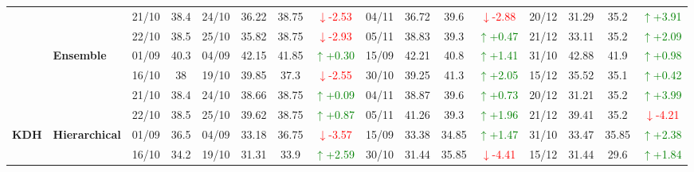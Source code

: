{\begin{longtable}{llcc|cccc|cccc|cccc}
& 
& 21/10 & 38.4 & 24/10 & 36.22 & 38.75 & \textcolor{red}{\(\downarrow\)-2.53} & 04/11 & 36.72 & 39.6 & \textcolor{red}{\(\downarrow\)-2.88} & 20/12 & 31.29 & 35.2 & \textcolor{green}{\(\uparrow\)+3.91} \\

&
& 22/10 & 38.5 & 25/10 & 35.82 & 38.75 & \textcolor{red}{\(\downarrow\)-2.93} & 05/11 & 38.83 & 39.3 & \textcolor{green}{\(\uparrow\)+0.47} & 21/12 & 33.11 & 35.2 & \textcolor{green}{\(\uparrow\)+2.09} \\
\cmidrule(lr){2-16}


& \textbf{Ensemble}
& 01/09 & 40.3 & 04/09 & 42.15 & 41.85 & \textcolor{green}{\(\uparrow\)+0.30} & 15/09 & 42.21 & 40.8 & \textcolor{green}{\(\uparrow\)+1.41} & 31/10 & 42.88 & 41.9 & \textcolor{green}{\(\uparrow\)+0.98} \\

& 
& 16/10 & 38 & 19/10 & 39.85 & 37.3 & \textcolor{red}{\(\downarrow\)-2.55} & 30/10 & 39.25 & 41.3 & \textcolor{green}{\(\uparrow\)+2.05} & 15/12 & 35.52 & 35.1 & \textcolor{green}{\(\uparrow\)+0.42} \\

& 
& 21/10 & 38.4 & 24/10 & 38.66 & 38.75 & \textcolor{green}{\(\uparrow\)+0.09} & 04/11 & 38.87 & 39.6 & \textcolor{green}{\(\uparrow\)+0.73} & 20/12 & 31.21 & 35.2 & \textcolor{green}{\(\uparrow\)+3.99} \\

&
& 22/10 & 38.5 & 25/10 & 39.62 & 38.75 & \textcolor{green}{\(\uparrow\)+0.87} & 05/11 & 41.26 & 39.3 & \textcolor{green}{\(\uparrow\)+1.96} & 21/12 & 39.41 & 35.2 & \textcolor{red}{\(\downarrow\)-4.21} \\
\midrule



\multirow{12}{*}{\textbf{KDH}} 
& \textbf{Hierarchical}
& 01/09 & 36.5 & 04/09 & 33.18 & 36.75 & \textcolor{red}{\(\downarrow\)-3.57} & 15/09 & 33.38 & 34.85 & \textcolor{green}{\(\uparrow\)+1.47} & 31/10 & 33.47 & 35.85 & \textcolor{green}{\(\uparrow\)+2.38} \\

&
& 16/10 & 34.2 & 19/10 & 31.31 & 33.9 & \textcolor{green}{\(\uparrow\)+2.59} & 30/10 & 31.44 & 35.85 & \textcolor{red}{\(\downarrow\)-4.41} & 15/12 & 31.44 & 29.6 & \textcolor{green}{\(\uparrow\)+1.84} \\


\end{longtable}}
